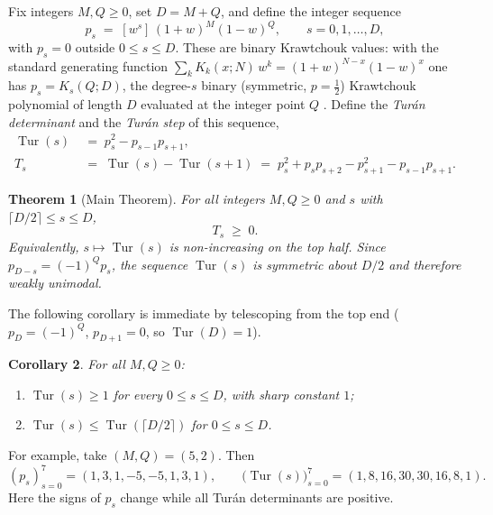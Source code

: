 \documentclass[twoside,10pt]{article}
\numberwithin{equation}{section}
\theoremstyle{slbody}
\newtheorem{theorem}{Theorem}
\newtheorem{corollary}[theorem]{Corollary}
\theoremstyle{definition}
\theoremstyle{remark}
\numberwithin{theorem}{section}
\DeclareMathOperator{\Tur}{Tur}
\newcommand{\coeff}[1]{[#1]\,}
\begin{document}
Fix integers $M,Q\ge 0$, set $D=M+Q$, and define the integer sequence
\begin{equation}\label{eq:pdef}
  p_s \;=\; \coeff{w^s}(1+w)^M(1-w)^Q, \qquad s=0,1,\dots,D,
\end{equation}
with $p_s=0$ outside $0\le s\le D$.  These are binary Krawtchouk values:
with the standard generating function
$\sum_k K_k(x;N)\,w^k=(1+w)^{N-x}(1-w)^x$ one has $p_s=K_s(Q;D)$, the
degree-$s$ binary (symmetric, $p=\tfrac12$) Krawtchouk polynomial of length
$D$ evaluated at the integer point $Q$ \cite[Section~9.11]{koekoek-lesky-swarttouw}.
Define the \emph{Tur\'an determinant} and the \emph{Tur\'an step} of this
sequence,
\begin{equation}\label{eq:Tdef}
\begin{aligned}
  \Tur(s) &\;=\; p_s^2-p_{s-1}p_{s+1},\\
  T_s &\;=\; \Tur(s)-\Tur(s+1)
    \;=\; p_s^2+p_sp_{s+2}-p_{s+1}^2-p_{s-1}p_{s+1}.
\end{aligned}
\end{equation}

\begin{theorem}[Main Theorem]\label{thm:main}
For all integers $M,Q\ge 0$ and $s$ with
$\lceil D/2\rceil\le s\le D$,
\[
  T_s \;\ge\; 0 .
\]
Equivalently, $s\mapsto\Tur(s)$ is non-increasing on the top half.  Since
$p_{D-s}=(-1)^Qp_s$, the sequence $\Tur(s)$ is symmetric about $D/2$ and
therefore weakly unimodal.
\end{theorem}

The following corollary is immediate by telescoping from the top end
($p_D=(-1)^Q$, $p_{D+1}=0$, so $\Tur(D)=1$).

\begin{corollary}\label{cor:positivity}
For all $M,Q\ge 0$:
\begin{enumerate}
\item $\Tur(s)\ge 1$ for every $0\le s\le D$, with sharp
  constant $1$;
\item $\Tur(s)\le\Tur(\lceil D/2\rceil)$ for $0\le s\le D$.
\end{enumerate}
\end{corollary}

For example, take $(M,Q)=(5,2)$.  Then
\[
 (p_s)_{s=0}^7=(1,3,1,-5,-5,1,3,1),
\qquad
 \bigl(\Tur(s)\bigr)_{s=0}^7=(1,8,16,30,30,16,8,1).
\]
Here the signs of $p_s$ change while all Tur\'an determinants are positive.
\end{document}
